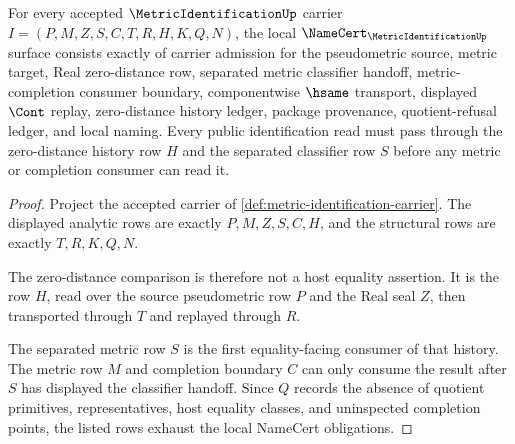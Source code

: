 \begin{theorem}
\label{thm:metric-identification-namecert-obligations}
For every accepted $\MetricIdentificationUp$ carrier $I=(P,M,Z,S,C,T,R,H,K,Q,N)$, the local $\NameCert_{\MetricIdentificationUp}$ surface consists exactly of carrier admission for the pseudometric source, metric target, Real zero-distance row, separated metric classifier handoff, metric-completion consumer boundary, componentwise $\hsame$ transport, displayed $\Cont$ replay, zero-distance history ledger, package provenance, quotient-refusal ledger, and local naming. Every public identification read must pass through the zero-distance history row $H$ and the separated classifier row $S$ before any metric or completion consumer can read it.
\end{theorem}
\begin{proof}
Project the accepted carrier of \autoref{def:metric-identification-carrier}. The displayed analytic rows are exactly $P,M,Z,S,C,H$, and the structural rows are exactly $T,R,K,Q,N$.

The zero-distance comparison is therefore not a host equality assertion. It is the row $H$, read over the source pseudometric row $P$ and the Real seal $Z$, then transported through $T$ and replayed through $R$.

The separated metric row $S$ is the first equality-facing consumer of that history. The metric row $M$ and completion boundary $C$ can only consume the result after $S$ has displayed the classifier handoff. Since $Q$ records the absence of quotient primitives, representatives, host equality classes, and uninspected completion points, the listed rows exhaust the local NameCert obligations.
\end{proof}

